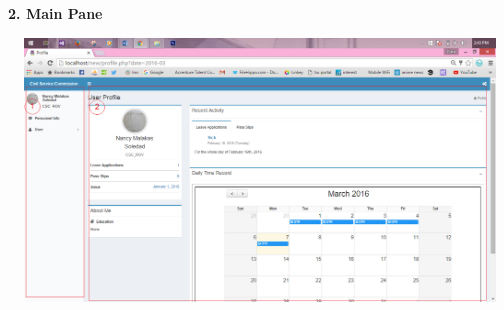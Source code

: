 \newpage
\noindent
\textbf{ 2. Main Pane \\}
\begin{center}
	\includegraphics[width=15cm,height=7cm]{image/profile_user.png}
\end{center} 

